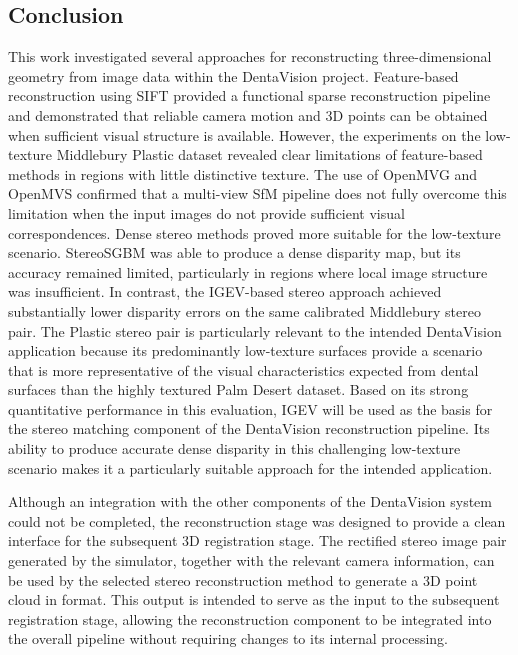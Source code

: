 \subsection{Conclusion}

This work investigated several approaches for reconstructing three-dimensional geometry from image data within the DentaVision project. Feature-based reconstruction using SIFT provided a functional sparse reconstruction pipeline and demonstrated that reliable camera motion and 3D points can be obtained when sufficient visual structure is available. However, the experiments on the low-texture Middlebury Plastic dataset revealed clear limitations of feature-based methods in regions with little distinctive texture. The use of OpenMVG and OpenMVS confirmed that a multi-view SfM pipeline does not fully overcome this limitation when the input images do not provide sufficient visual correspondences.
Dense stereo methods proved more suitable for the low-texture scenario. StereoSGBM was able to produce a dense disparity map, but its accuracy remained limited, particularly in regions where local image structure was insufficient. In contrast, the IGEV-based stereo approach achieved substantially lower disparity errors on the same calibrated Middlebury stereo pair.
The Plastic stereo pair is particularly relevant to the intended DentaVision application because its predominantly low-texture surfaces provide a scenario that is more representative of the visual characteristics expected from dental surfaces than the highly textured Palm Desert dataset. Based on its strong quantitative performance in this evaluation, IGEV will be used as the basis for the stereo matching component of the DentaVision reconstruction pipeline. Its ability to produce accurate dense disparity in this challenging low-texture scenario makes it a particularly suitable approach for the intended application.

Although an integration with the other components of the DentaVision system could not be completed, the reconstruction stage was designed to provide a clean interface for the subsequent 3D registration stage. The rectified stereo image pair generated by the simulator, together with the relevant camera information, can be used by the selected stereo reconstruction method to generate a 3D point cloud in  format. This output is intended to serve as the input to the subsequent registration stage, allowing the reconstruction component to be integrated into the overall pipeline without requiring changes to its internal processing.